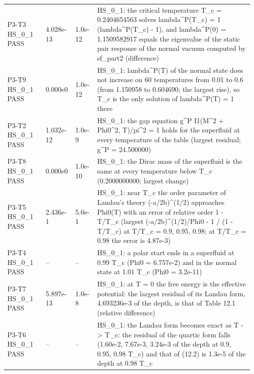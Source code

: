 \documentclass[aps,prd,onecolumn,superscriptaddress,nofootinbib,floatfix,longbibliography]{revtex4-2}
\begin{document}
\begin{longtable}{p{}p{}p{}p{}}
P3-T3 HS\_0\_1 \newline PASS & 4.028e-13 & 1.0e-12 & HS\_0\_1: the critical temperature T\_c = 0.2404654563 solves lambda\textasciicircum{}P(T\_c) = 1 (\textbar{}lambda\textasciicircum{}P(T\_c) - 1\textbar{}), and lambda\textasciicircum{}P(0) = 1.1509582917 equals the eigenvalue of the static pair response of the normal vacuum computed by sf\_part2 (difference) \\
P3-T9 HS\_0\_1 \newline PASS & 0.000e0 & 1.0e-12 & HS\_0\_1: lambda\textasciicircum{}P(T) of the normal state does not increase on 60 temperatures from 0.01 to 0.6 (from 1.150958 to 0.604690; the largest rise), so T\_c is the only solution of lambda\textasciicircum{}P(T) = 1 there \\
P3-T2 HS\_0\_1 \newline PASS & 1.032e-12 & 1.0e-9 & HS\_0\_1: the gap equation g\textasciicircum{}P I1(M\textasciicircum{}2 + Phi0\textasciicircum{}2, T)/pi\textasciicircum{}2 = 1 holds for the superfluid at every temperature of the table (largest \textbar{}residual\textbar{}; g\textasciicircum{}P = 24.500000) \\
P3-T8 HS\_0\_1 \newline PASS & 0.000e0 & 1.0e-10 & HS\_0\_1: the Dirac mass of the superfluid is the same at every temperature below T\_c (0.2000000000; largest change) \\
P3-T5 HS\_0\_1 \newline PASS & 2.436e-1 & 5.0e-1 & HS\_0\_1: near T\_c the order parameter of Landau's theory (-a/2b)\textasciicircum{}(1/2) approaches Phi0(T) with an error of relative order 1 - T/T\_c (largest \textbar{}(-a/2b)\textasciicircum{}(1/2)/Phi0 - 1\textbar{} / (1 - T/T\_c) at T/T\_c = 0.9, 0.95, 0.98; at T/T\_c = 0.98 the error is 4.87e-3) \\
P3-T4 HS\_0\_1 \newline PASS & -- & -- & HS\_0\_1: a polar start ends in a superfluid at 0.99 T\_c (Phi0 = 6.757e-2) and in the normal state at 1.01 T\_c (Phi0 = 3.2e-11) \\
P3-T7 HS\_0\_1 \newline PASS & 5.897e-13 & 1.0e-8 & HS\_0\_1: at T = 0 the free energy is the effective potential: the largest residual of its Landau form, 4.693236e-3 of the depth, is that of Table 12.1 (relative difference) \\
P3-T6 HS\_0\_1 \newline PASS & -- & -- & HS\_0\_1: the Landau form becomes exact as T -\textgreater{} T\_c: the residual of the quartic form falls (1.60e-2, 7.67e-3, 3.24e-3 of the depth at 0.9, 0.95, 0.98 T\_c) and that of (12.2) is 1.3e-5 of the depth at 0.98 T\_c \\

\end{longtable}
\end{document}
